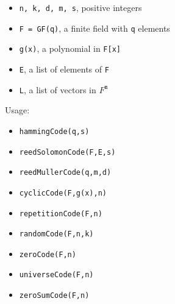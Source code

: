 \documentclass[12pt]{amsart}
\theoremstyle{plain}
\begin{document}
\begin{minipage}[t]{0.53\textwidth}
\begin{itemize}[leftmargin=0.55 cm]
  \item {\tt n, k, d, m, s}, positive integers
  \item {\tt F = GF(q)}, a finite field with {\tt q} elements
  \item {\tt g(x)}, a polynomial in {\tt F[x]}
 \end{itemize}
\end{minipage}
\begin{minipage}[t]{0.45\textwidth}
 \begin{itemize}[leftmargin=0.55 cm]
  \item {\tt E}, a list of elements of {\tt F}
  \item {\tt L}, a list of vectors in $F^{\mathtt{m}}$
 \end{itemize}
\end{minipage}

\medskip

Usage:

\medskip

\begin{minipage}[t]{0.35\textwidth}
\begin{itemize}[leftmargin=0.55 cm]
\item {\tt hammingCode(q,s)}
\item {\tt reedSolomonCode(F,E,s)}
\item {\tt reedMullerCode(q,m,d)}
\end{itemize}
\end{minipage}
\begin{minipage}[t]{0.33\textwidth}
\begin{itemize}[leftmargin=0.55 cm]
\item {\tt cyclicCode(F,g(x),n)}
\item {\tt repetitionCode(F,n)}
\item {\tt randomCode(F,n,k)}
\end{itemize}
\end{minipage}
\begin{minipage}[t]{0.3\textwidth}
\begin{itemize}[leftmargin=0.55 cm]
\item {\tt zeroCode(F,n)}
\item {\tt universeCode(F,n)}
\item {\tt zeroSumCode(F,n)}
\end{itemize}
\end{minipage}
\end{document}
